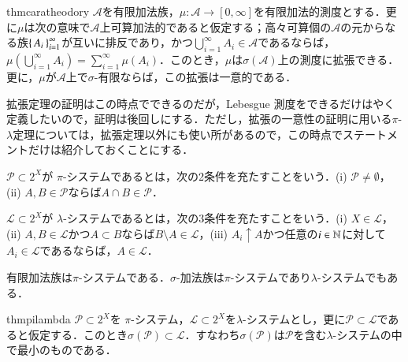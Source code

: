 \begin{restatable}{thm}{caratheodory}\label{拡張定理}
$\mathcal{A}$を有限加法族，$\mu \colon \mathcal{A} \to [0,\infty]$を有限加法的測度とする．更に$\mu$は次の意味で$\mathcal{A}$上可算加法的であると仮定する；高々可算個の$\mathcal{A}$の元からなる族$\set{A_i}_{i=1}^\infty$が互いに排反であり，かつ$\bigcup_{i=1}^\infty A_i \in \mathcal{A}$であるならば，$\mu\left(\bigcup_{i=1}^\infty A_i \right) = \sum_{i=1}^\infty \mu(A_i)$．このとき，$\mu$は$\sigma(\mathcal{A})$上の測度に拡張できる．更に，$\mu$が$\mathcal{A}$上で$\sigma$-有限ならば，この拡張は一意的である．
\end{restatable}

拡張定理の証明はこの時点でできるのだが，Lebesgue 測度をできるだけはやく定義したいので，証明は後回しにする．ただし，拡張の一意性の証明に用いる$\pi$-$\lambda$定理については，拡張定理以外にも使い所があるので，この時点でステートメントだけは紹介しておくことにする．

\begin{defi}
$\mathcal{P} \subset 2^X$が $\pi$-システムであるとは，次の2条件を充たすことをいう．(i) $\mathcal{P} \neq \emptyset$，(ii) $A, B \in \mathcal{P}$ならば$A \cap B \in \mathcal{P}$．

$\mathcal{L} \subset 2^X$が $\lambda$-システムであるとは，次の3条件を充たすことをいう．(i) $X \in \mathcal{L}$，(ii) $A, B \in \mathcal{L}$かつ$A \subset B$ならば$B \setminus A \in \mathcal{L}$，(iii) $A_i \uparrow A$かつ任意の$i \in \mathbb{N}$に対して$A_i \in \mathcal{L}$であるならば，$A \in \mathcal{L}$．
\end{defi}

\begin{que}
有限加法族は$\pi$-システムである．$\sigma$-加法族は$\pi$-システムであり$\lambda$-システムでもある．
\end{que}

\begin{restatable}{thm}{pilambda}\label{Dynkin族定理}
$\mathcal{P} \subset 2^X$を $\pi$-システム，$\mathcal{L} \subset 2^X$を$\lambda$-システムとし，更に$\mathcal{P} \subset \mathcal{L}$であると仮定する．このとき$\sigma(\mathcal{P})\subset \mathcal{L}$．すなわち$\sigma(\mathcal{P})$は$\mathcal{P}$を含む$\lambda$-システムの中で最小のものである．
\end{restatable}

